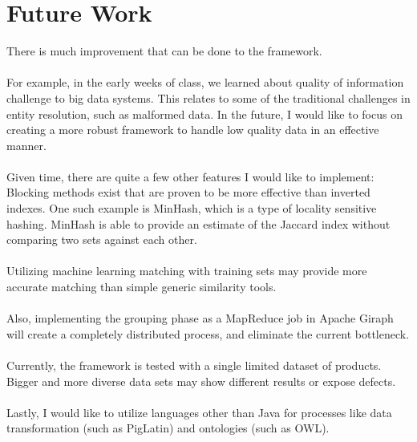 \documentclass[12pt]{article}
\begin{document}
\section{Future Work}
There is much improvement that can be done to the framework.\\\\
For example, in the early weeks of class, we learned about quality of information challenge to big data systems. This relates to some of the traditional challenges in entity resolution, such as malformed data. In the future, I would like to focus on creating a more robust framework to handle low quality data in an effective manner.\\\\
Given time, there are quite a few other features I would like to implement:
Blocking methods exist that are proven to be more effective than inverted indexes. One such example is MinHash, which is a type of locality sensitive hashing.
MinHash is able to provide an estimate of the Jaccard index without comparing two sets against each other.\\\\
Utilizing machine learning matching with training sets may provide more accurate matching than simple generic similarity tools.\\\\
Also, implementing the grouping phase as a MapReduce job in Apache Giraph will create a completely distributed process, and eliminate the current bottleneck.\\\\
Currently, the framework is tested with a single limited dataset of products.
Bigger and more diverse data sets may show different results or expose defects.\\\\
Lastly, I would like to utilize languages other than Java for processes like data transformation (such as PigLatin) and ontologies (such as OWL).
\end{document}

